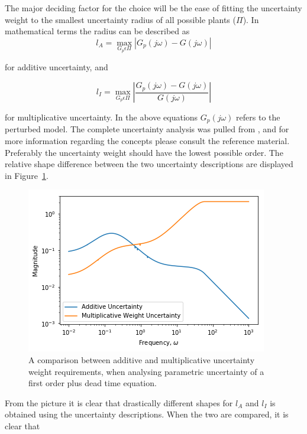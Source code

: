The major deciding factor for the choice will be the ease of fitting the uncertainty weight to the smallest uncertainty radius of all possible plants ($\Pi$). In mathematical terms the radius can be described as 
\begin{equation}
	l_A = \max_{G_p \epsilon \Pi} |G_p(j\omega) - G(j\omega)|
\end{equation}

for additive uncertainty, and 

\begin{equation}
	l_I = \max_{G_p \epsilon \Pi} |\frac{G_p(j\omega) - G(j\omega)}{G(j\omega)}|
\end{equation}

for multiplicative uncertainty. In the above equations $G_p(j\omega)$ refers to the perturbed model. The complete uncertainty analysis was pulled from \textcite{skogestad}, and for more information regarding the concepts please consult the reference material. Preferably the uncertainty weight should have the lowest possible order. The relative shape difference between the two uncertainty descriptions are displayed in Figure~\ref{fig:uncertaintyadditivevsmultiplicative}.

\begin{figure}[H]
	\centering
	\includegraphics[width=0.7\linewidth]{Figures/Uncertainty_Additive_vs_Multiplicative}
	\caption{A comparison between additive and multiplicative uncertainty weight requirements, when analysing parametric uncertainty of a first order plus dead time equation.}
	\label{fig:uncertaintyadditivevsmultiplicative}
\end{figure}

From the picture it is clear that drastically different shapes for $l_A$ and $l_I$ is obtained using the uncertainty descriptions. When the two are compared, it is clear that

